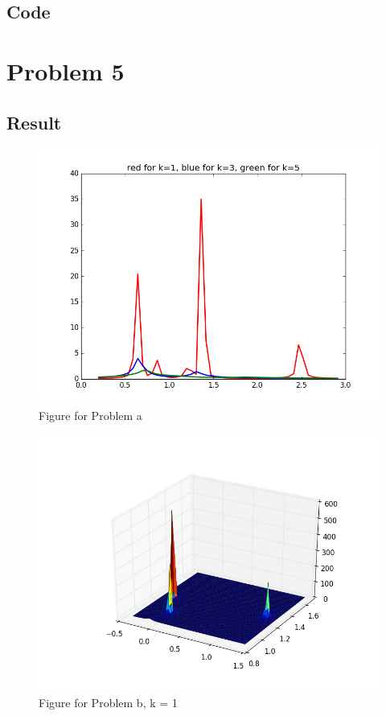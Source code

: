 \documentclass[]{article}
\begin{document}
    \subsection{Code}
    
    \section{Problem 5}
    \subsection{Result}
    \begin{figure}[H]
        \centering
        \includegraphics[scale=0.4]{6_a.png}
        \caption{Figure for Problem a}
    \end{figure}
    \begin{figure}[H]
        \centering
        \includegraphics[scale=0.4]{6_b_1.png}
        \caption{Figure for Problem b, k = 1}
    \end{figure}
\end{document}
